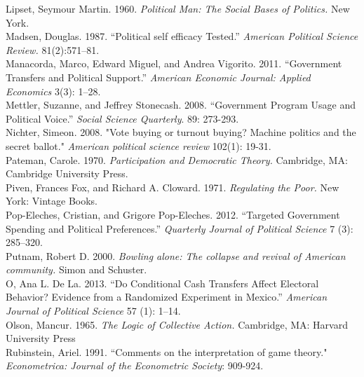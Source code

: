 \documentclass[12pt]{paper}
\begin{document}
\begin{hangparas}{.25in}{1}
Lipset, Seymour Martin. 1960. \textit{Political Man: The Social Bases of Politics.} New York. 
\\

Madsen, Douglas. 1987. ``Political self efficacy Tested.” \textit{American Political Science Review.} 81(2):571–81.
\\

Manacorda, Marco, Edward Miguel, and Andrea Vigorito. 2011. ``Government Transfers and Political Support.” \textit{American Economic Journal: Applied Economics} 3(3): 1–28.
\\

Mettler, Suzanne, and Jeffrey Stonecash. 2008. ``Government Program Usage and Political Voice.” \textit{Social Science Quarterly}. 89: 273-293. 
\\

Nichter, Simeon. 2008. "Vote buying or turnout buying? Machine politics and the secret ballot." \textit{American political science review} 102(1): 19-31.
\\

Pateman, Carole. 1970. \textit{Participation and Democratic Theory. }Cambridge, MA: Cambridge University Press.
\\

Piven, Frances Fox, and Richard A. Cloward. 1971. \textit{Regulating the Poor.} New York: Vintage Books.
\\

Pop-Eleches, Cristian, and Grigore Pop-Eleches. 2012. ``Targeted Government Spending and Political Preferences.” \textit{Quarterly Journal of Political Science} 7 (3): 285–320.
\\

Putnam, Robert D. 2000. \textit{Bowling alone: The collapse and revival of American community.} Simon and Schuster.
\\

O, Ana L. De La. 2013. ``Do Conditional Cash Transfers Affect Electoral Behavior? Evidence from a Randomized Experiment in Mexico.” \textit{American Journal of Political Science} 57 (1): 1–14.
\\

Olson, Mancur. 1965. \textit{The Logic of Collective Action.} Cambridge, MA: Harvard University Press
\\

Rubinstein, Ariel. 1991. ``Comments on the interpretation of game theory." \textit{Econometrica: Journal of the Econometric Society}: 909-924.
\\


\end{hangparas}
\end{document}
